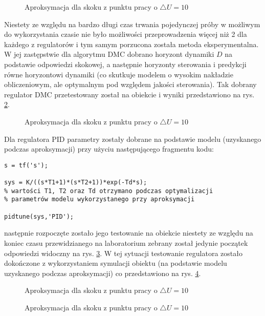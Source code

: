\begin{figure}[ht]
\centering

\caption{Aproksymacja dla skoku z punktu pracy o $\triangle U = 10$}
\label{R4}
\end{figure}
Niestety ze względu na bardzo długi czas trwania pojedynczej próby w możliwym do wykorzystania czasie nie było możliwości przeprowadzenia więcej niż 2 dla każdego z regulatorów i tym samym porzucona została metoda eksperymentalna. W jej zastępstwie dla algorytmu DMC dobrano horyzont dynamiki $D$ na podstawie odpowiedzi skokowej, a następnie horyzonty sterowania i predykcji równe horyzontowi dynamiki (co skutkuje modelem o wysokim nakładzie obliczeniowym, ale optymalnym pod względem jakości sterowania). Tak dobrany regulator DMC przetestowany został na obiekcie i wyniki przedstawiono na rys. \ref{R5}.

\begin{figure}[ht]
\centering

\caption{Aproksymacja dla skoku z punktu pracy o $\triangle U = 10$}
\label{R5}
\end{figure}
Dla regulatora PID parametry zostały dobrane na podstawie modelu (uzyskanego podczas aproksymacji) przy użyciu następującego fragmentu kodu:

\begin{lstlisting}[style=Matlab-editor]
s = tf('s');

sys = K/((s*T1+1)*(s*T2+1))*exp(-Td*s);
% wartości T1, T2 oraz Td otrzymano podczas optymalizacji
% parametrów modelu wykorzystanego przy aproksymacji

pidtune(sys,'PID');
\end{lstlisting} 

następnie rozpoczęte zostało jego testowanie na obiekcie niestety ze względu na koniec czasu przewidzianego na laboratorium zebrany został jedynie początek odpowiedzi widoczny na rys. \ref{R6}. W tej sytuacji testowanie regulatora zostało dokończone z wykorzystaniem symulacji obiektu (na podstawie modelu uzyskanego podczas aproksymacji) co przedstawiono na rys. \ref{R7}.

\begin{figure}[ht]
\centering

\caption{Aproksymacja dla skoku z punktu pracy o $\triangle U = 10$}
\label{R6}
\end{figure}

\begin{figure}[ht]
\centering

\caption{Aproksymacja dla skoku z punktu pracy o $\triangle U = 10$}
\label{R7}
\end{figure}
